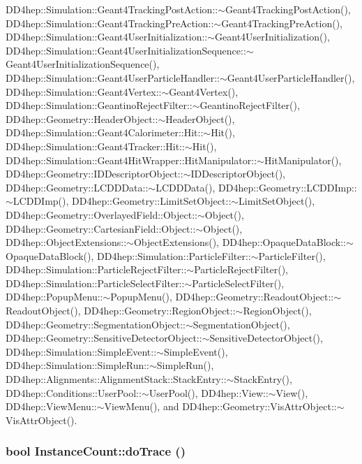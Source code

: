 DD4hep::Simulation::Geant4TrackingPostAction::$\sim$Geant4TrackingPostAction(), DD4hep::Simulation::Geant4TrackingPreAction::$\sim$Geant4TrackingPreAction(), DD4hep::Simulation::Geant4UserInitialization::$\sim$Geant4UserInitialization(), DD4hep::Simulation::Geant4UserInitializationSequence::$\sim$Geant4UserInitializationSequence(), DD4hep::Simulation::Geant4UserParticleHandler::$\sim$Geant4UserParticleHandler(), DD4hep::Simulation::Geant4Vertex::$\sim$Geant4Vertex(), DD4hep::Simulation::GeantinoRejectFilter::$\sim$GeantinoRejectFilter(), DD4hep::Geometry::HeaderObject::$\sim$HeaderObject(), DD4hep::Simulation::Geant4Calorimeter::Hit::$\sim$Hit(), DD4hep::Simulation::Geant4Tracker::Hit::$\sim$Hit(), DD4hep::Simulation::Geant4HitWrapper::HitManipulator::$\sim$HitManipulator(), DD4hep::Geometry::IDDescriptorObject::$\sim$IDDescriptorObject(), DD4hep::Geometry::LCDDData::$\sim$LCDDData(), DD4hep::Geometry::LCDDImp::$\sim$LCDDImp(), DD4hep::Geometry::LimitSetObject::$\sim$LimitSetObject(), DD4hep::Geometry::OverlayedField::Object::$\sim$Object(), DD4hep::Geometry::CartesianField::Object::$\sim$Object(), DD4hep::ObjectExtensions::$\sim$ObjectExtensions(), DD4hep::OpaqueDataBlock::$\sim$OpaqueDataBlock(), DD4hep::Simulation::ParticleFilter::$\sim$ParticleFilter(), DD4hep::Simulation::ParticleRejectFilter::$\sim$ParticleRejectFilter(), DD4hep::Simulation::ParticleSelectFilter::$\sim$ParticleSelectFilter(), DD4hep::PopupMenu::$\sim$PopupMenu(), DD4hep::Geometry::ReadoutObject::$\sim$ReadoutObject(), DD4hep::Geometry::RegionObject::$\sim$RegionObject(), DD4hep::Geometry::SegmentationObject::$\sim$SegmentationObject(), DD4hep::Geometry::SensitiveDetectorObject::$\sim$SensitiveDetectorObject(), DD4hep::Simulation::SimpleEvent::$\sim$SimpleEvent(), DD4hep::Simulation::SimpleRun::$\sim$SimpleRun(), DD4hep::Alignments::AlignmentStack::StackEntry::$\sim$StackEntry(), DD4hep::Conditions::UserPool::$\sim$UserPool(), DD4hep::View::$\sim$View(), DD4hep::ViewMenu::$\sim$ViewMenu(), and DD4hep::Geometry::VisAttrObject::$\sim$VisAttrObject().\hypertarget{struct_d_d4hep_1_1_instance_count_afa4f90d11074c40ba3bde59bb5c59785}{
\subsubsection[{doTrace}]{\setlength{\rightskip}{0pt plus 5cm}bool InstanceCount::doTrace ()}}
\label{struct_d_d4hep_1_1_instance_count_afa4f90d11074c40ba3bde59bb5c59785}


